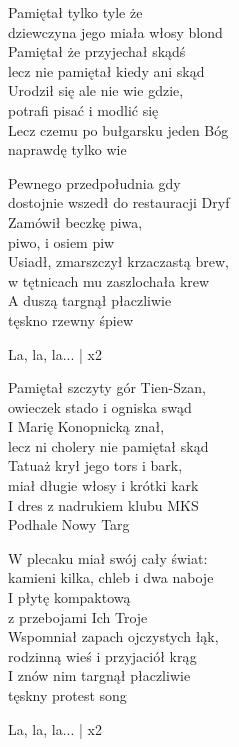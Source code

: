 \begin{text}
   Pamiętał tylko tyle że\\
   dziewczyna jego miała włosy blond\\
   Pamiętał że przyjechał skądś\\
   lecz nie pamiętał kiedy ani skąd\\
   Urodził się ale nie wie gdzie,\\
   potrafi pisać i modlić się\\
   Lecz czemu po bułgarsku jeden Bóg\\
   naprawdę tylko wie
    
   Pewnego przedpołudnia gdy\\
   dostojnie wszedł do restauracji Dryf\\
   Zamówił beczkę piwa,\\
   piwo, i osiem piw\\
   Usiadł, zmarszczył krzaczastą brew,\\
   w tętnicach mu zaszlochała krew\\
   A duszą targnął płaczliwie\\
   tęskno rzewny śpiew
    
   \vin La, la, la... | x2

   Pamiętał szczyty gór Tien-Szan,\\
   owieczek stado i ogniska swąd\\
   I Marię Konopnicką znał,\\
   lecz ni cholery nie pamiętał skąd\\
   Tatuaż krył jego tors i bark,\\
   miał długie włosy i krótki kark\\
   I dres z nadrukiem klubu MKS\\
   Podhale Nowy Targ

   W plecaku miał swój cały świat:\\
   kamieni kilka, chleb i dwa naboje\\
   I płytę kompaktową\\
   z przebojami Ich Troje\\
   Wspomniał zapach ojczystych łąk,\\
   rodzinną wieś i przyjaciół krąg\\
   I znów nim targnął płaczliwie\\
   tęskny protest song

   \vin La, la, la... | x2


\end{text}
